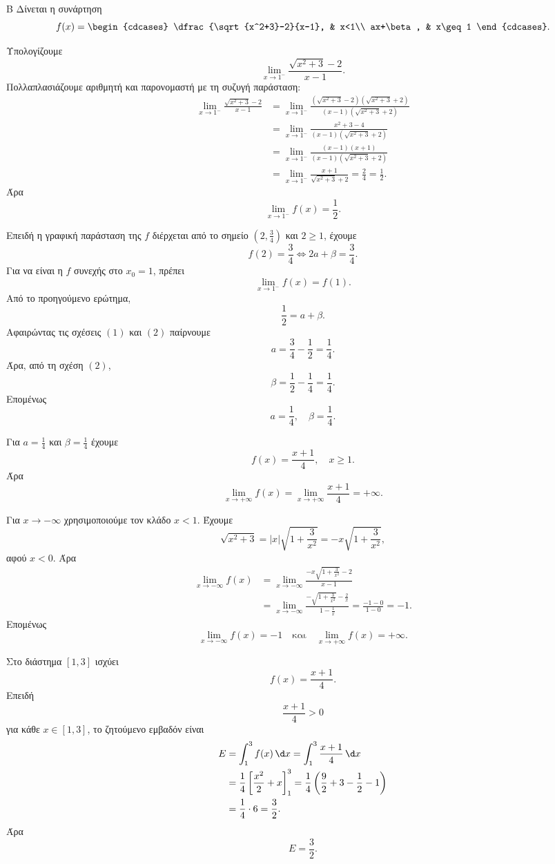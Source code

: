 \begin{thema}{Β}
Δίνεται η συνάρτηση
\[
f(x)=
\begin{cdcases}
\dfrac{\sqrt{x^2+3}-2}{x-1}, & x<1\\
ax+\beta, & x\geq1
\end{cdcases}.
\]
\begin{erwthma}
\item Υπολογίζουμε
\[
\lim_{x\to1^-}\frac{\sqrt{x^2+3}-2}{x-1}.
\]
Πολλαπλασιάζουμε αριθμητή και παρονομαστή με τη συζυγή παράσταση:
\begin{align*}
\lim_{x\to1^-}\frac{\sqrt{x^2+3}-2}{x-1}
&=\lim_{x\to1^-}
\frac{(\sqrt{x^2+3}-2)(\sqrt{x^2+3}+2)}
{(x-1)(\sqrt{x^2+3}+2)}\\
&=\lim_{x\to1^-}\frac{x^2+3-4}{(x-1)(\sqrt{x^2+3}+2)}\\
&=\lim_{x\to1^-}\frac{(x-1)(x+1)}{(x-1)(\sqrt{x^2+3}+2)}\\
&=\lim_{x\to1^-}\frac{x+1}{\sqrt{x^2+3}+2}
=\frac{2}{4}=\frac{1}{2}.
\end{align*}
Άρα
\[
{\lim_{x\to1^-}f(x)=\frac{1}{2}}.
\]

\item Επειδή η γραφική παράσταση της $f$ διέρχεται από το σημείο $\left(2,\frac{3}{4}\right)$ και $2\geq1$, έχουμε
\[
f(2)=\frac{3}{4}
\Leftrightarrow 2a+\beta=\frac{3}{4}. \tag{1}
\]
Για να είναι η $f$ συνεχής στο $x_0=1$, πρέπει
\[
\lim_{x\to1^-}f(x)=f(1).
\]
Από το προηγούμενο ερώτημα,
\[
\frac{1}{2}=a+\beta. \tag{2}
\]
Αφαιρώντας τις σχέσεις $(1)$ και $(2)$ παίρνουμε
\[
a=\frac{3}{4}-\frac{1}{2}=\frac{1}{4}.
\]
Άρα, από τη σχέση $(2)$,
\[
\beta=\frac{1}{2}-\frac{1}{4}=\frac{1}{4}.
\]
Επομένως
\[
{a=\frac{1}{4},\quad \beta=\frac{1}{4}}.
\]

\item Για $a=\frac{1}{4}$ και $\beta=\frac{1}{4}$ έχουμε
\[
f(x)=\frac{x+1}{4},\quad x\geq1.
\]
Άρα
\[
\lim_{x\to+\infty}f(x)=\lim_{x\to+\infty}\frac{x+1}{4}=+\infty.
\]

Για $x\to-\infty$ χρησιμοποιούμε τον κλάδο $x<1$. Έχουμε
\[
\sqrt{x^2+3}=|x|\sqrt{1+\frac{3}{x^2}}
=-x\sqrt{1+\frac{3}{x^2}},
\]
αφού $x<0$. Άρα
\begin{align*}
\lim_{x\to-\infty}f(x)
&=\lim_{x\to-\infty}
\frac{-x\sqrt{1+\frac{3}{x^2}}-2}{x-1}\\
&=\lim_{x\to-\infty}
\frac{-\sqrt{1+\frac{3}{x^2}}-\frac{2}{x}}{1-\frac{1}{x}}
=\frac{-1-0}{1-0}=-1.
\end{align*}
Επομένως
\[
{\lim_{x\to-\infty}f(x)=-1}
\quad\text{και}\quad
{\lim_{x\to+\infty}f(x)=+\infty}.
\]

\item Στο διάστημα $[1,3]$ ισχύει
\[
f(x)=\frac{x+1}{4}.
\]
Επειδή
\[
\frac{x+1}{4}>0
\]
για κάθε $x\in[1,3]$, το ζητούμενο εμβαδόν είναι
\begin{align*}
E&=\dint_1^3 f(x)\,\d x
=\dint_1^3\frac{x+1}{4}\,\d x\\
&=\frac{1}{4}\left[\frac{x^2}{2}+x\right]_1^3
=\frac{1}{4}\left(\frac{9}{2}+3-\frac{1}{2}-1\right)\\
&=\frac{1}{4}\cdot6=\frac{3}{2}.
\end{align*}
Άρα
\[
{E=\frac{3}{2}}.
\]
\end{erwthma}
\end{thema}

